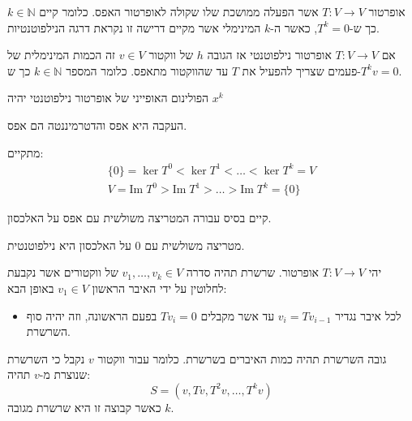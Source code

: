 \documentclass{tstextbook}
\begin{document}
\begin{definition}
אופרטור \(T:V\to V\) אשר הפעלה ממושכת שלו שקולה לאופרטור האפס. כלומר קיים \(k \in \mathbb{N}\) כך ש-\(T^{k}=0\), כאשר ה-\(k\) המינימלי אשר מקיים דרישה זו נקראת דרגה הנילפוטנטיות.

\end{definition}
\begin{definition}
אם \(T:V\to V\) אופרטור נילפוטנטי אז הגובה \(h\) של ווקטור \(v \in V\) זה הכמות המינימלית של פעמים שצריך להפעיל את \(T\) עד שהווקטור מתאפס. כלומר המספר \(k\in \mathbb{N}\) כך ש-\(T^{k}v=0\).

\end{definition}
\begin{proposition}
הפולינום האופייני של אופרטור נילפוטנטי יהיה \(x^{k}\)

\end{proposition}
\begin{proposition}
העקבה היא אפס והדטרמיננטה הם אפס.

\end{proposition}
\begin{proposition}
מתקיים:
$$\begin{array}{c}{\{0\}=\ker T^{0}<\ker T^{1}<\ldots<\ker T^{k}=V}\\ {V=\mathrm{Im}\;T^{0}>\mathrm{Im}\;T^{1}>\ldots>\mathrm{Im}\;T^{k}=\{0\}}\end{array}$$

\end{proposition}
\begin{proposition}
קיים בסיס עבורה המטריצה משולשית עם אפס על האלכסון.

\end{proposition}
\begin{proposition}
מטריצה משולשית עם 0 על האלכסון היא נילפוטנטית.

\end{proposition}
\begin{definition}[שרשרת]
יהי \(T:V\to V\) אופרטור. שרשרת תהיה סדרה \(v_{1},\dots,v_{k}\in V\) של ווקטורים אשר נקבעת לחלוטין על ידי האיבר הראשון \(v_{1} \in V\) באופן הבא:

  \begin{itemize}
    \item לכל איבר נגדיר \(v_{i}=Tv_{i-1}\) עד אשר מקבלים \(Tv_{i}=0\) בפעם הראשונה, וזה יהיה סוף השרשרת.
  \end{itemize}
\end{definition}
\begin{definition}
גובה השרשרת תהיה כמות האיברים בשרשרת. כלומר עבור ווקטור \(v\) נקבל כי השרשרת שנוצרת מ-\(v\) תהיה:
$$S=\left( v, Tv, T^{2}v ,\dots ,T^{k}v \right)$$
כאשר קבוצה זו היא שרשרת מגובה \(k\).

\end{definition}
\end{document}
